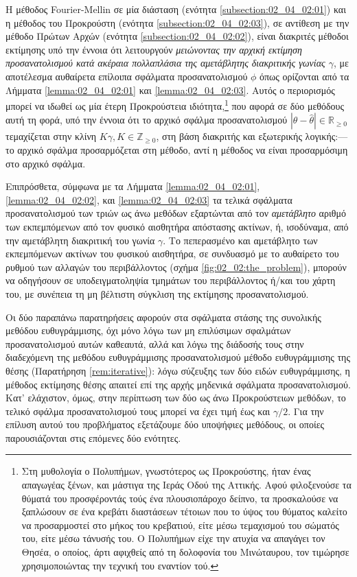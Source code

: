 Η μέθοδος Fourier-Mellin σε μία διάσταση (ενότητα \ref{subsection:02_04_02:01})
και η μέθοδος του Προκρούστη (ενότητα \ref{subsection:02_04_02:03}), σε
αντίθεση με την μέθοδο Πρώτων Αρχών (ενότητα \ref{subsection:02_04_02:02}),
είναι διακριτές μέθοδοι εκτίμησης υπό την έννοια ότι λειτουργούν
\textit{μειώνοντας την αρχική εκτίμηση προσανατολισμού κατά ακέραια πολλαπλάσια
της αμετάβλητης διακριτικής γωνίας $\gamma$}, με αποτέλεσμα αυθαίρετα επίλοιπα
σφάλματα προσανατολισμού $\phi$ όπως ορίζονται από τα Λήμματα
\ref{lemma:02_04_02:01} και \ref{lemma:02_04_02:03}. Αυτός ο περιορισμός
μπορεί να ιδωθεί ως μία έτερη Προκρούστεια ιδιότητα,\footnote{Στη μυθολογία ο
Πολυπήμων, γνωστότερος ως Προκρούστης, ήταν ένας απαγωγέας ξένων, και μάστιγα
της Ιεράς Οδού της Αττικής. Αφού φιλοξενούσε τα θύματά του προσφέροντάς τούς
ένα πλουσιοπάροχο δείπνο, τα προσκαλούσε να ξαπλώσουν σε ένα κρεβάτι διαστάσεων
τέτοιων που το ύψος του θύματος καλείτο να προσαρμοστεί στο μήκος του
κρεβατιού, είτε μέσω τεμαχισμού του σώματός του, είτε μέσω τάνυσής του. Ο
Πολυπήμων είχε την ατυχία να απαγάγει τον Θησέα, ο οποίος, άρτι αφιχθείς από τη
δολοφονία του Μινώταυρου, τον τιμώρησε χρησιμοποιώντας την τεχνική του εναντίον
τού.} που αφορά σε δύο μεθόδους αυτή τη φορά, υπό την έννοια ότι το αρχικό
σφάλμα προσανατολισμού $|\theta - \hat{\theta}| \in \mathbb{R}_{\geq 0}$
τεμαχίζεται στην κλίνη $K\gamma, K \in \mathbb{Z}_{\geq 0}$, στη βάση διακριτής
και εξωτερικής λογικής:---το αρχικό σφάλμα προσαρμόζεται στη μέθοδο, αντί η
μέθοδος να είναι προσαρμόσιμη στο αρχικό σφάλμα.

Επιπρόσθετα, σύμφωνα με τα Λήμματα \ref{lemma:02_04_02:01},
\ref{lemma:02_04_02:02}, και \ref{lemma:02_04_02:03} τα τελικά σφάλματα
προσανατολισμού των τριών ως άνω μεθόδων εξαρτώνται από τον \textit{αμετάβλητο}
αριθμό των εκπεμπόμενων από τον φυσικό αισθητήρα απόστασης ακτίνων, ή,
ισοδύναμα, από την αμετάβλητη διακριτική του γωνία $\gamma$. Το πεπερασμένο και
αμετάβλητο των εκπεμπόμενων ακτίνων του φυσικού αισθητήρα, σε συνδυασμό με το
αυθαίρετο του ρυθμού των αλλαγών του περιβάλλοντος (σχήμα
\ref{fig:02_02:the_problem}), μπορούν να οδηγήσουν σε υποδειγματοληψία τμημάτων
του περιβάλλοντος ή/και του χάρτη του, με συνέπεια τη μη βέλτιστη σύγκλιση της
εκτίμησης προσανατολισμού.

Οι δύο παραπάνω παρατηρήσεις αφορούν στα σφάλματα στάσης της συνολικής μεθόδου
ευθυγράμμισης, όχι μόνο λόγω των μη επιλύσιμων σφαλμάτων προσανατολισμού αυτών
καθεαυτά, αλλά και λόγω της διάδοσής τους στην διαδεχόμενη της μεθόδου
ευθυγράμμισης προσανατολισμού μέθοδο ευθυγράμμισης της θέσης (Παρατήρηση
\ref{rem:iterative}): λόγω σύζευξης των δύο ειδών ευθυγράμμισης, η μέθοδος
εκτίμησης θέσης απαιτεί επί της αρχής μηδενικά σφάλματα προσανατολισμού. Κατ'
ελάχιστον, όμως, στην περίπτωση των δύο ως άνω Προκρούστειων μεθόδων, το τελικό
σφάλμα προσανατολισμού τους μπορεί να έχει τιμή έως και $\gamma/2$. Για την
επίλυση αυτού του προβλήματος εξετάζουμε δύο υποψήφιες μεθόδους, οι οποίες
παρουσιάζονται στις επόμενες δύο ενότητες.


